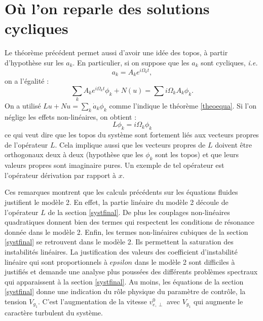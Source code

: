 \documentclass{book}
\begin{document}
{\section{O\`u l'on  reparle des solutions cycliques}
Le th\'eor\`eme pr\'ec\'edent permet aussi d'avoir une id\'ee des
topos, \`a partir d'hypoth\`ese sur les $a_k$.
En particulier, si on suppose que les $a_k$ sont cycliques, {\it i.e.}
\begin{equation}
a_k=A_k e
^{i\Omega_k t},
\end{equation}
on a l'\'egalit\'e :
\begin{equation}
\sum_k A_k e^{i\Omega_k t}\phi_k+N(u)=\sum i\Omega_k A_k \phi_k.
\end{equation}
On a utilis\'e $Lu+Nu=\sum_k\dot a_k \phi_k$ comme l'indique le
th\'eor\`eme \ref{theoequa}.
Si l'on n\'eglige les effets non-lin\'eaires, on obtient :
\begin{equation}
L\phi_k=i\Omega_k\phi_k
\end{equation}
ce qui veut dire que les topos du syst\`eme sont fortement li\'es aux
vecteurs propres de l'op\'erateur $L$.
Cela implique aussi que les vecteurs propres de $L$ doivent \^etre
orthogonaux deux \`a deux (hypoth\`ese que les $\phi_k$ sont les
topos) et que leurs valeurs propres sont imaginaire pures. Un exemple
de tel op\'erateur est l'op\'erateur d\'erivation par rapport \`a $x$.


Ces remarques montrent que les calculs pr\'ec\'edents sur les
\'equations fluides justifient le mod\`ele 2. En effet, la partie
lin\'eaire du mod\`ele 2 d\'ecoule de l'op\'erateur $L$ de la section
\ref{systfinal}. De plus les couplages non-lin\'eaires quadratiques
donnent bien des termes qui respectent les conditions de r\'esonance
donn\'ee dans le mod\`ele 2. Enfin, les termes non-lin\'eaires
cubiques de la section
\ref{systfinal} se retrouvent dans le mod\`ele 2. Ils permettent la
saturation des instabilit\'es lin\'eaires. La justification des
valeurs des coefficient d'instabilit\'e lin\'eaire qui sont
proportionnels \`a $epsilon$ dans le mod\`ele 2 sont difficiles \`a
justifi\'es et demande une analyse plus pouss\'ees des diff\'erents
probl\`emes spectraux qui apparaissent \`a la section \ref{systfinal}.
Au moins, les \'equations de la section \ref{systfinal} donne une
indication du r\^ole physique du param\`etre de contr\^ole, la tension
$V_{g_1}$. C'est l'augmentation de la vitesse $v^0_{e,\perp}$ avec
$V_{g_1}$ qui augmente le caract\`ere turbulent du syst\`eme.

}
\end{document}
